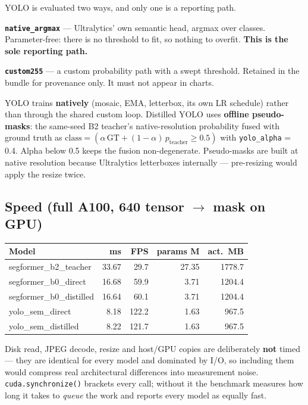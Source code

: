 \documentclass[11pt]{article}
\begin{document}
YOLO is evaluated two ways, and only one is a reporting path.

\textbf{\texttt{native\_argmax}} --- Ultralytics' own semantic head, argmax over
classes. Parameter-free: there is no threshold to fit, so nothing to overfit.
\textbf{This is the sole reporting path.}

\textbf{\texttt{custom255}} --- a custom probability path with a swept threshold.
Retained in the bundle for provenance only. It must not appear in charts.

YOLO trains \textbf{natively} (mosaic, EMA, letterbox, its own LR schedule)
rather than through the shared custom loop. Distilled YOLO uses \textbf{offline
pseudo-masks}: the same-seed B2 teacher's native-resolution probability fused
with ground truth as
$\mathrm{class} = (\alpha\,\mathrm{GT} + (1-\alpha)\,p_{\mathrm{teacher}} \ge 0.5)$
with \texttt{yolo\_alpha} = 0.4. Alpha below 0.5 keeps the fusion non-degenerate.
Pseudo-masks are built at native resolution because Ultralytics letterboxes
internally --- pre-resizing would apply the resize twice.

\subsection{Speed (full A100, 640 tensor $\rightarrow$ mask on GPU)}

\begin{center}
\begin{tabular}{Lnnnn}
\toprule
\textbf{Model} & \textbf{ms} & \textbf{FPS} & \textbf{params M} & \textbf{act.\ MB} \\
\midrule
segformer\_b2\_teacher & 33.67 & 29.7 & 27.35 & 1778.7 \\
segformer\_b0\_direct & 16.68 & 59.9 & 3.71 & 1204.4 \\
segformer\_b0\_distilled & 16.64 & 60.1 & 3.71 & 1204.4 \\
yolo\_sem\_direct & 8.18 & 122.2 & 1.63 & 967.5 \\
yolo\_sem\_distilled & 8.22 & 121.7 & 1.63 & 967.5 \\
\bottomrule
\end{tabular}
\end{center}

Disk read, JPEG decode, resize and host/GPU copies are deliberately \textbf{not}
timed --- they are identical for every model and dominated by I/O, so including
them would compress real architectural differences into measurement noise.
\texttt{cuda.synchronize()} brackets every call; without it the benchmark
measures how long it takes to \emph{queue} the work and reports every model as
equally fast.
\end{document}
